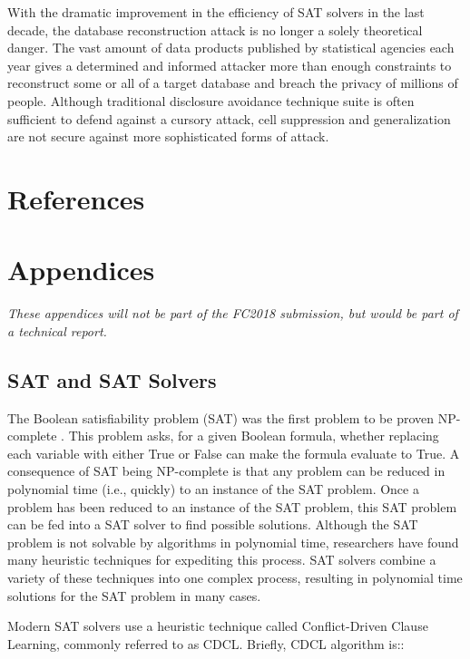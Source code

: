 \documentclass[runningheads]{llncs}
\begin{document}
With the dramatic improvement in the efficiency of SAT solvers in the
last decade, the database reconstruction attack is no longer a solely
theoretical danger. The vast amount of data products published by
statistical agencies each year gives a determined and informed attacker more than
enough constraints to reconstruct some or all of a target database and
breach the privacy of millions of people. Although traditional
disclosure avoidance technique suite is often sufficient to
defend against a cursory attack, cell suppression and
generalization are not secure against more sophisticated
forms of attack.

\section{References}





\section{Appendices}

\emph{These appendices will not be part of the FC2018 submission, but
  would be part of a technical report.}

\subsection{SAT and SAT Solvers}

The Boolean satisfiability problem (SAT) was the first
problem to be proven NP-complete \cite{cooklevin}. This problem asks,
for a given Boolean formula, whether replacing each variable with
either True or False can make the formula evaluate to True.  A
consequence of SAT being NP-complete is that any problem can be
reduced in polynomial time (i.e., quickly) to an instance of the SAT
problem. Once a problem has been reduced to an instance of the SAT
problem, this SAT problem can be fed into a SAT solver to find
possible solutions. Although the SAT problem is not solvable by
algorithms in polynomial time, researchers have found many heuristic
techniques for expediting this process. SAT solvers combine a variety
of these techniques into one complex process, resulting in polynomial
time solutions for the SAT problem in many cases.

Modern SAT solvers use a heuristic technique called Conflict-Driven
Clause Learning, commonly referred to as CDCL\cite{cdcl}. Briefly, CDCL algorithm
is::
\end{document}
